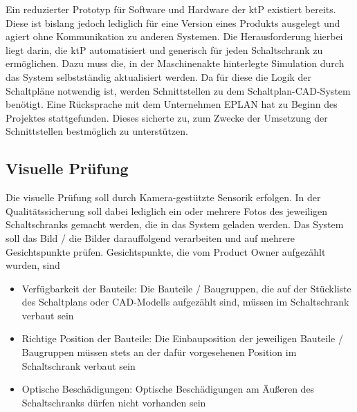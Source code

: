 \documentclass[
    type=Prakikumsbericht,
    status=draft, %
    language=german, %
    bibengine=bibtex,
]{unibwm-inf-thesis}
\begin{document}
    Ein reduzierter Prototyp für Software und Hardware der \ac{ktP} existiert bereits.
    Diese ist bislang jedoch lediglich für eine Version eines Produkts ausgelegt und agiert ohne Kommunikation zu anderen Systemen.
    Die Herausforderung hierbei liegt darin, die \ac{ktP} automatisiert und generisch für jeden Schaltschrank zu ermöglichen.
    Dazu muss die, in der Maschinenakte hinterlegte Simulation durch das System selbstständig aktualisiert werden.
    Da für diese die Logik der Schaltpläne notwendig ist, werden Schnittstellen zu dem Schaltplan-CAD-System benötigt.
    Eine Rücksprache mit dem Unternehmen EPLAN hat zu Beginn des Projektes stattgefunden.
    Dieses sicherte zu, zum Zwecke der Umsetzung der Schnittstellen bestmöglich zu unterstützen.

    \subsection{Visuelle Prüfung}\label{subsec:visuelle-prufung}
    Die visuelle Prüfung soll durch Kamera-gestützte Sensorik erfolgen.
    In der Qualitätssicherung soll dabei lediglich ein oder mehrere Fotos des jeweiligen Schaltschranks gemacht werden, die in das System geladen werden.
    Das System soll das Bild / die Bilder darauffolgend verarbeiten und auf mehrere Gesichtspunkte prüfen.
    Gesichtspunkte, die vom Product Owner aufgezählt wurden, sind
    \begin{itemize}
        \item Verfügbarkeit der Bauteile: Die Bauteile / Baugruppen, die auf der Stückliste des Schaltplans oder
        CAD-Modells aufgezählt sind, müssen im Schaltschrank verbaut sein
        \item Richtige Position der Bauteile: Die Einbauposition der jeweiligen Bauteile / Baugruppen müssen stets an
        der dafür vorgesehenen Position im Schaltschrank verbaut sein
        \item Optische Beschädigungen: Optische Beschädigungen am Äußeren des Schaltschranks dürfen nicht vorhanden sein
    \end{itemize}
\end{document}
